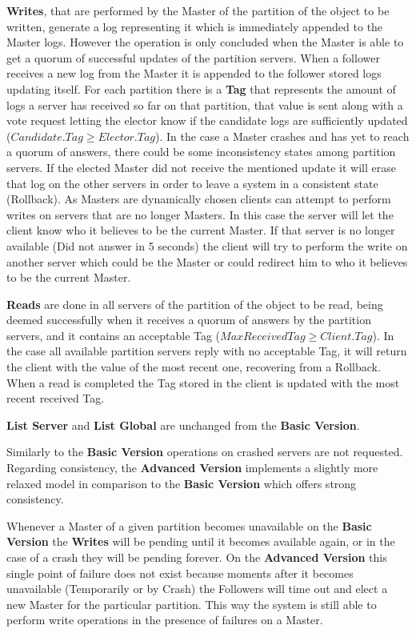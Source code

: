 \documentclass[times, 10pt,twocolumn]{article}
\begin{document}
\textbf{Writes}, that are performed by the Master of the partition of the object to be written, generate a log representing it which is immediately appended to the Master logs. However the operation is only concluded when the Master is able to get a quorum of successful updates of the partition servers. When a follower receives a new log from the Master it is appended to the follower stored logs updating itself. For each partition there is a \textbf{Tag} that represents the amount of logs a server has received so far on that partition, that value is sent along with a vote request letting the elector know if the candidate logs are sufficiently updated (\(Candidate.Tag \geq Elector.Tag\)). In the case a Master crashes and has yet to reach a quorum of answers, there could be some inconsistency states among partition servers. If the elected Master did not receive the mentioned update it will erase that log on the other servers in order to leave a system in a consistent state (Rollback). As Masters are dynamically chosen clients can attempt to perform writes on servers that are no longer Masters. In this case the server will let the client know who it believes to be the current Master. If that server is no longer available (Did not answer in 5 seconds) the client will try to perform the write on another server which could be the Master or could redirect him to who it believes to be the current Master.

\textbf{Reads} are done in all servers of the partition of the object to be read, being deemed successfully when it receives a quorum of answers by the partition servers, and it contains an acceptable Tag (\(MaxReceivedTag \geq Client.Tag\)). In the case all available partition servers reply with no acceptable Tag, it will return the client with the value of the most recent one, recovering from a Rollback. When a read is completed the Tag stored in the client is updated with the most recent received Tag.

\textbf{List Server} and \textbf{List Global} are unchanged from the \textbf{Basic Version}.

Similarly to the \textbf{Basic Version} operations on crashed servers are not requested.
Regarding consistency, the \textbf{Advanced Version} implements a slightly more relaxed model in comparison to the \textbf{Basic Version} which offers strong consistency.

Whenever a Master of a given partition becomes unavailable on the \textbf{Basic Version} the \textbf{Writes} will be pending until it becomes available again, or in the case of a crash they will be pending forever. On the \textbf{Advanced Version} this single point of failure does not exist because moments after it becomes unavailable (Temporarily or by Crash) the Followers will time out and elect a new Master for the particular partition. This way the system is still able to perform write operations in the presence of failures on a Master.
\end{document}
